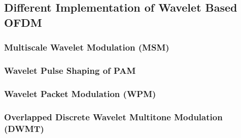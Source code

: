  		\subsection{Different Implementation of Wavelet Based OFDM}
		\subsubsection{Multiscale Wavelet Modulation (MSM)}
		\subsubsection{Wavelet Pulse Shaping of PAM}
		\subsubsection{Wavelet Packet Modulation (WPM)}
		\subsubsection{Overlapped Discrete Wavelet Multitone Modulation (DWMT)}
